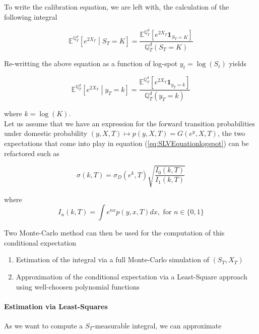 \documentclass{article}
\begin{document}
\noindent To write the calibration equation, we are left with, the calculation of the following integral

\begin{equation}
	\mathbb{E}^{\mathbb{Q}_T^d}\left[e^{2X_T}\middle| S_T=K\right] = \frac{\mathbb{E}^{\mathbb{Q}_T^d}\left[e^{2X_T} \textbf{1}_{S_T=K}\right]}{\mathbb{Q}_T^d(S_T = K)}
\end{equation}

\noindent Re-writting the above equation as a function of log-spot $y_t = \log\left(S_t\right)$ yields

\begin{equation}
	\label{eq:SLVEquationlogspot}
	\mathbb{E}^{\mathbb{Q}_T^d}\left[e^{2X_T}\middle| y_T=k\right] = \frac{\mathbb{E}^{\mathbb{Q}_T^d}\left[e^{2X_T} \textbf{1}_{y_T=k}\right]}{\mathbb{Q}_T^d(y_T = k)}
\end{equation}

\noindent where $k = \log(K)$.\\

\noindent Let us assume that we have an expression for the forward transition probabilities under domestic probability $(y,X,T) \mapsto p(y,X,T) = G(e^y,X,T)$, the two expectations that come into play in equation (\ref{eq:SLVEquationlogspot}) can be refactored such as

\begin{equation}
	\label{eq:calibrationlocalvolSLV}
	\sigma(k,T) = \sigma_D(e^k, T) \sqrt{\frac{I_0(k,T)}{I_1(k,T)}}
\end{equation}

\noindent where
\begin{equation}
	\label{eq:Inintegral}
	I_n(k,T) = \int e^{nx} p(y,x,T) dx, \text{ for } n \in \{0,1\}
\end{equation}

\noindent Two Monte-Carlo method can then be used for the computation of this conditional expectation

\begin{enumerate}
	\item Estimation of the integral via a full Monte-Carlo simulation of $(S_T,X_T)$
	\item Approximation of the conditional expectation via a Least-Square approach using well-choosen polynomial functions
\end{enumerate}

\paragraph{Estimation via Least-Squares}
As we want to compute a $S_T$-measurable integral, we can approximate
\end{document}
